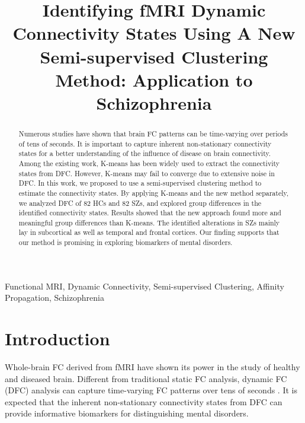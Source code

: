 \documentclass{article}
\title{Identifying fMRI Dynamic Connectivity States Using A New Semi-supervised Clustering Method: Application to Schizophrenia}
\begin{document}
\ninept

\maketitle

\begin{abstract}

Numerous studies have shown that brain \acl{FC} patterns can be time-varying over periods of tens of seconds. It is important to capture inherent non-stationary connectivity states for a better understanding of the influence of disease on brain connectivity. Among the existing work, K-means has been widely used to extract the connectivity states from \ac{DFC}. However, K-means may fail to converge due to extensive noise in \ac{DFC}. In this work, we proposed to use a semi-supervised clustering method to estimate the connectivity states. By applying K-means and the new method separately, we analyzed \ac{DFC} of 82 \aclp{HC} and 82 \aclp{SZ}, and explored group differences in the identified connectivity states. Results showed that the new approach found more and meaningful group differences than K-means. The identified alterations in \aclp{SZ} mainly lay in subcortical as well as temporal and frontal cortices. Our finding supports that our method is promising in exploring biomarkers of mental disorders.

\end{abstract}

\begin{keywords}
Functional MRI, Dynamic Connectivity, Semi-supervised Clustering, Affinity Propagation, Schizophrenia
\end{keywords}


\section{Introduction}
\label{sec:intro}

Whole-brain \ac{FC} derived from \ac{fMRI} have shown its power in the study of healthy and diseased brain. Different from traditional static \ac{FC} analysis, dynamic \ac{FC} (\acs{DFC}) analysis can capture time-varying \ac{FC} patterns over tens of seconds \cite{allen_tracking_2014} \cite{calhoun_chronnectome:_2014} \cite{damaraju_dynamic_2014} \cite{du_group_2015} \cite{du_interaction_2016} \cite{rashid_dynamic_2014}. It is expected that the inherent non-stationary connectivity states from \ac{DFC} can provide informative biomarkers for distinguishing mental disorders.
\end{document}
